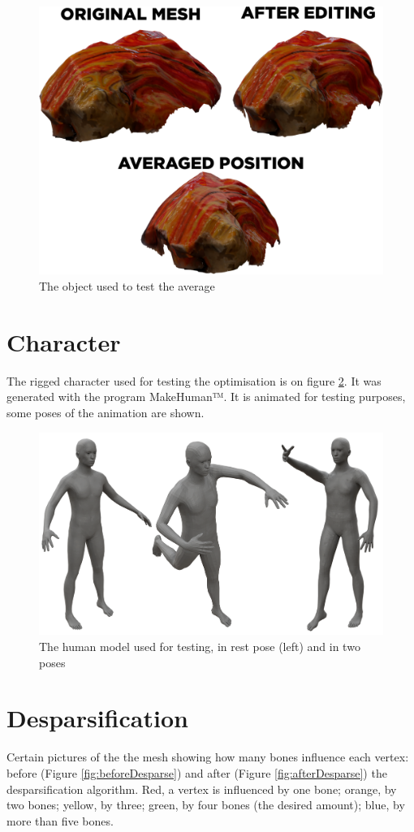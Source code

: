 \documentclass[12pt,twoside]{report}
\begin{document}
\begin{figure}[hp]
    \centering
    \includegraphics[width=35ex]{graphics/glassRock_three.png}
    \caption{The object used to test the average}
    \label{fig:glassRock_three}
\end{figure}

\section{Character}
\label{sec:characterPlaceholder}
The rigged character used for testing the optimisation is on figure \ref{fig:character_poses}. It was generated with the program MakeHuman™. It is animated for testing purposes, some poses of the animation are shown.

\begin{figure}[ht]
    \centering
    \includegraphics[width=\textwidth]{graphics/character_poses.png}
    \caption[The human model used for testing]{The human model used for testing, in rest pose (left) and in two poses}
    \label{fig:character_poses}
\end{figure}

\section{Desparsification}
\label{sec:despars_results}
Certain pictures of the the mesh showing how many bones influence each vertex: before (Figure \ref{fig:beforeDesparse}) and after (Figure \ref{fig:afterDesparse}) the desparsification algorithm. Red, a vertex is influenced by one bone; orange, by two bones; yellow, by three; green, by four bones (the desired amount); blue, by more than five bones.
\end{document}

